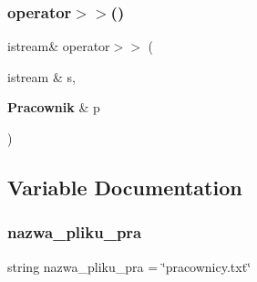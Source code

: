 \mbox{\label{pracownik_8cpp_a514d9af5b092da25ac1cf108d6cb9069}} 
\subsubsection{operator$>$$>$()}
{\footnotesize\ttfamily istream\& operator$>$$>$ (\begin{DoxyParamCaption}\item[{istream \&}]{s,  }\item[{\textbf{ Pracownik} \&}]{p }\end{DoxyParamCaption})}



\subsection{Variable Documentation}
\mbox{\label{pracownik_8cpp_ad819bf244f9d183b1fbc03a880d6169d}} 
\subsubsection{nazwa\+\_\+pliku\+\_\+pra}
{\footnotesize\ttfamily string nazwa\+\_\+pliku\+\_\+pra = \char`\"{}pracownicy.\+txt\char`\"{}}

